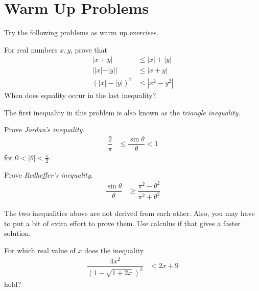 \documentclass{subfile}
\begin{document}
	\section{Warm Up Problems}
	Try the following problems as warm up exercises.
		\begin{problem}
			For real numbers $x,y$, prove that
				\begin{align*}
					|x+y|
						& \leq|x|+|y|\\
					||x|-|y||
						& \leq|x+y|\\
					(|x|-|y|)^2
						& \leq|x^2-y^2|
				\end{align*}
			When does equality occur in the last inequality?
		\end{problem}
	The first inequality in this problem is also known as the \textit{triangle inequality}.
		\begin{problem}
			Prove \textit{Jordan's inequality}.
				\begin{align*}
					\dfrac{2}{\pi}
						& \leq\dfrac{\sin{\theta}}{\theta}<1
				\end{align*}
			for $0<|\theta|<\frac{\pi}{2}$.
		\end{problem}
	
		\begin{problem}
			Prove \textit{Redheffer's inequality}.
				\begin{align*}
					\dfrac{\sin{\theta}}{\theta}
						& \geq\dfrac{\pi^2-\theta^2}{\pi^2+\theta^2}
				\end{align*}
		\end{problem}
	The two inequalities above are not derived from each other. Also, you may have to put a bit of extra effort to prove them. Use calculus if that gives a faster solution.
		\begin{problem}
			For which real value of $x$ does the inequality
				\begin{align*}
					\dfrac{4x^2}{(1-\sqrt{1+2x})^2}
						& <2x+9
				\end{align*}
			hold?
		\end{problem}
\end{document}
